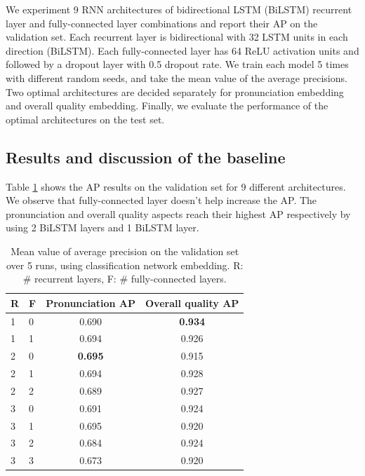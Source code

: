 We experiment 9 RNN architectures of bidirectional LSTM (BiLSTM) recurrent layer and fully-connected layer combinations and report their AP on the validation set. Each recurrent layer is bidirectional with 32 LSTM units in each direction (BiLSTM). Each fully-connected layer has 64 ReLU activation units and followed by a dropout layer with 0.5 dropout rate. We train each model 5 times with different random seeds, and take the mean value of the average precisions. Two optimal architectures are decided separately for pronunciation embedding and overall quality embedding. Finally, we evaluate the performance of the optimal architectures on the test set.

\subsection{Results and discussion of the baseline}\label{sec:ch7:baseline_results_classification}

Table \ref{tab:ch7:validation_classification} shows the AP results on the validation set for 9 different architectures. We observe that fully-connected layer doesn't help increase the AP. The pronunciation and overall quality aspects reach their highest AP respectively by using 2 BiLSTM layers and 1 BiLSTM layer. 

\begin{table}[ht!]
\centering
\caption{Mean value of average precision on the validation set over 5 runs, using classification network embedding. R: \# recurrent layers, F: \# fully-connected layers.}
\label{tab:ch7:validation_classification}
\begin{tabular}{llcc}
\toprule
R & F & Pronunciation AP & Overall quality AP \\
\midrule
1 & 0 & 0.690            & \textbf{0.934}     \\
1 & 1 & 0.694            & 0.926              \\
2 & 0 & \textbf{0.695}   & 0.915              \\
2 & 1 & 0.694            & 0.928              \\
2 & 2 & 0.689            & 0.927              \\
3 & 0 & 0.691            & 0.924              \\
3 & 1 & 0.695            & 0.920              \\
3 & 2 & 0.684            & 0.924              \\
3 & 3 & 0.673            & 0.920             \\
\bottomrule
\end{tabular}
\end{table}

